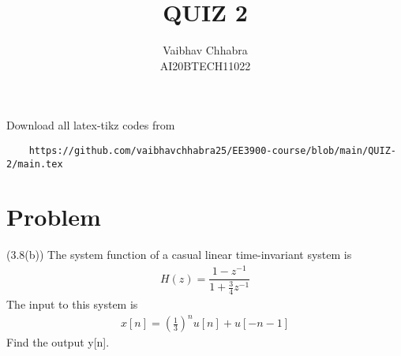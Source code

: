 \documentclass[journal,12pt,twocolumn]{IEEEtran}
\begin{document}
     \def\topbox#1{\raisebox{-\baselineskip}[0in][0in]{#1}}
     \def\midbox#1{\raisebox{-0.5\baselineskip}[0in][0in]{#1}}
\vspace{3cm}
\title{QUIZ 2}
\author{Vaibhav Chhabra\\ AI20BTECH11022}
\maketitle
\newpage
\bigskip
\renewcommand{\thefigure}{\theenumi}
\renewcommand{\thetable}{\theenumi}
Download all latex-tikz codes from 
%
\begin{lstlisting}
    https://github.com/vaibhavchhabra25/EE3900-course/blob/main/QUIZ-2/main.tex
\end{lstlisting}
%
\section{Problem}
(3.8(b))
The system function of a casual linear time-invariant system is
\begin{align}
    H(z)=\dfrac{1-z^{-1}}{1+\frac{3}{4}z^{-1}}
\end{align}
The input to this system is 
\begin{align}
    x[n]=\left(\frac{1}{3}\right)^n u[n] + u[-n-1]
\end{align}
Find the output y[n].
\end{document}
